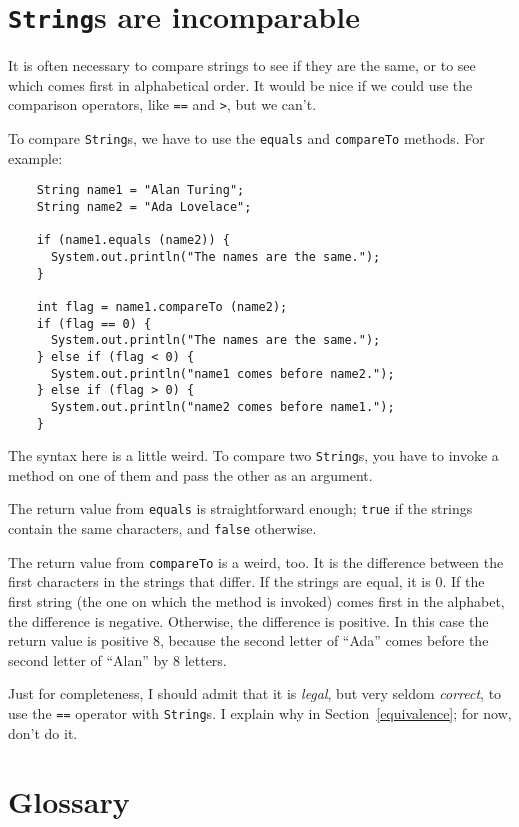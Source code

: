 \section{{\tt String}s are incomparable}
\label{incomparable}

It is often necessary to compare strings to see if they are the same,
or to see which comes first in alphabetical order.  It would be
nice if we could use the comparison operators, like {\tt ==} and
{\tt >}, but we can't.

To compare {\tt String}s, we have to use the {\tt equals}
and {\tt compareTo} methods.  For example:

\begin{lstlisting}
    String name1 = "Alan Turing";
    String name2 = "Ada Lovelace";

    if (name1.equals (name2)) {
      System.out.println("The names are the same.");
    }

    int flag = name1.compareTo (name2);
    if (flag == 0) {
      System.out.println("The names are the same.");
    } else if (flag < 0) {
      System.out.println("name1 comes before name2.");
    } else if (flag > 0) {
      System.out.println("name2 comes before name1.");
    }
\end{lstlisting}
%
The syntax here is a little weird.  To compare two {\tt String}s,
you have to invoke a method on one of them and pass the other as an
argument.

The return value from {\tt equals} is straightforward enough;
{\tt true} if the strings contain the same characters, and
{\tt false} otherwise.

The return value from {\tt compareTo} is a weird, too.  It is
the difference between the first characters in the strings
that differ.  If the strings are equal, it is 0.  If the
first string (the one on which the method is invoked) comes
first in the alphabet, the difference is negative.  Otherwise,
the difference is positive.  In this case the return value
is positive 8, because the second letter of ``Ada'' comes
before the second letter of ``Alan'' by 8 letters.

Just for completeness, I should admit that it is {\em legal}, but very
seldom {\em correct}, to use the {\tt ==} operator with {\tt String}s.
I explain why in Section~\ref{equivalence}; for now, don't do it.


\section{Glossary}

